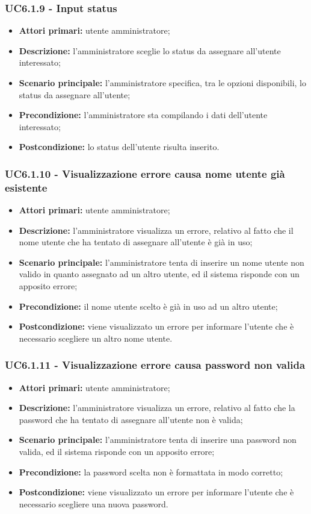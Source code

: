 \subsubsection{UC6.1.9 - Input status}
\begin{itemize}
	\item \textbf{Attori primari:} utente amministratore;
	\item \textbf{Descrizione:} l'amministratore sceglie lo status da assegnare all'utente interessato;
	\item \textbf{Scenario principale:} l'amministratore specifica, tra le opzioni disponibili, lo status da assegnare all'utente;
	\item \textbf{Precondizione:} l'amministratore sta compilando i dati dell'utente interessato;
	\item \textbf{Postcondizione:} lo status dell'utente risulta inserito.
\end{itemize}

\subsubsection{UC6.1.10 - Visualizzazione errore causa nome utente già esistente}
	\begin{itemize}
		\item \textbf{Attori primari:} utente amministratore;
		\item \textbf{Descrizione:} l'amministratore visualizza un errore, relativo al fatto che il nome utente che ha tentato di assegnare all'utente è già in uso;
		\item \textbf{Scenario principale:} l'amministratore tenta di inserire un nome utente non valido in quanto assegnato ad un altro utente, ed il sistema risponde con un apposito errore;
		\item \textbf{Precondizione:} il nome utente scelto è già in uso ad un altro utente;
		\item \textbf{Postcondizione:} viene visualizzato un errore per informare l'utente che è necessario scegliere un altro nome utente.
	\end{itemize}

\subsubsection{UC6.1.11 - Visualizzazione errore causa password non valida}
	\begin{itemize}
		\item \textbf{Attori primari:} utente amministratore;
		\item \textbf{Descrizione:} l'amministratore visualizza un errore, relativo al fatto che la password che ha tentato di assegnare all'utente non è valida;
		\item \textbf{Scenario principale:} l'amministratore tenta di inserire una password non valida, ed il sistema risponde con un apposito errore;
		\item \textbf{Precondizione:} la password scelta non è formattata in modo corretto;
		\item \textbf{Postcondizione:} viene visualizzato un errore per informare l'utente che è necessario scegliere una nuova password.
	\end{itemize}

